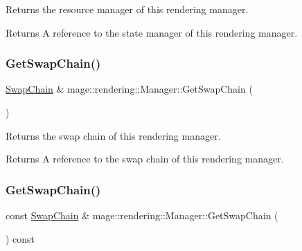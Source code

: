 Returns the resource manager of this rendering manager.

\begin{DoxyReturn}{Returns}
A reference to the state manager of this rendering manager. 
\end{DoxyReturn}
\hypertarget{classmage_1_1rendering_1_1_manager_a3cfc594583bb0c762375a1283d263fd1}{}\label{classmage_1_1rendering_1_1_manager_a3cfc594583bb0c762375a1283d263fd1} 
\subsubsection{\texorpdfstring{Get\+Swap\+Chain()}{GetSwapChain()}\hspace{0.1cm}{\footnotesize\ttfamily [1/2]}}
{\footnotesize\ttfamily \hyperlink{classmage_1_1rendering_1_1_swap_chain}{Swap\+Chain} \& mage\+::rendering\+::\+Manager\+::\+Get\+Swap\+Chain (\begin{DoxyParamCaption}{ }\end{DoxyParamCaption})\hspace{0.3cm}{\ttfamily [noexcept]}}

Returns the swap chain of this rendering manager.

\begin{DoxyReturn}{Returns}
A reference to the swap chain of this rendering manager. 
\end{DoxyReturn}
\hypertarget{classmage_1_1rendering_1_1_manager_a219939c5316dd348822e39c89141d429}{}\label{classmage_1_1rendering_1_1_manager_a219939c5316dd348822e39c89141d429} 
\subsubsection{\texorpdfstring{Get\+Swap\+Chain()}{GetSwapChain()}\hspace{0.1cm}{\footnotesize\ttfamily [2/2]}}
{\footnotesize\ttfamily const \hyperlink{classmage_1_1rendering_1_1_swap_chain}{Swap\+Chain} \& mage\+::rendering\+::\+Manager\+::\+Get\+Swap\+Chain (\begin{DoxyParamCaption}{ }\end{DoxyParamCaption}) const\hspace{0.3cm}{\ttfamily [noexcept]}}


